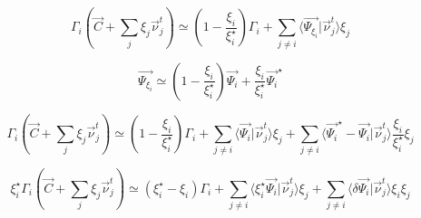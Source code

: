 \documentclass[aps,12pt]{revtex4}
\begin{document}
\begin{equation}
	\Gamma_i\left(\vec{C}+\sum_j \xi_j \vec{\nu}_j^t\right) \simeq \left(1-\dfrac{\xi_i}{\xi_i^\star}\right)\Gamma_i 
 + \sum_{j\not=i} \langle \vec{\Psi_{\xi_i}} \vert \vec{\nu}_j^t  \rangle \xi_j
\end{equation}

\begin{equation}
	\vec{\Psi_{\xi_i}} \simeq \left(1-\dfrac{\xi_i}{\xi_i^\star}\right) \vec{\Psi_i} + \dfrac{\xi_i}{\xi_i^\star} 
	\vec{\Psi_i}^\star
\end{equation}

\begin{equation}
	\Gamma_i\left(\vec{C}+\sum_j \xi_j \vec{\nu}_j^t\right) \simeq
	\left(1-\dfrac{\xi_i}{\xi_i^\star}\right)\Gamma_i 
	+\sum_{j\not=i} \langle \vec{\Psi_i} \vert \vec{\nu}_j^t  \rangle \xi_j
	+\sum_{j\not=i} \langle \vec{\Psi_i}^\star - \vec{\Psi_i} \vert \vec{\nu}_j^t  \rangle \dfrac{\xi_i}{\xi_i^\star} \xi_j
\end{equation}

\begin{equation}
	\xi_i^\star\Gamma_i\left(\vec{C}+\sum_j \xi_j \vec{\nu}_j^t\right) \simeq
	\left(\xi_i^\star- \xi_i\right)\Gamma_i 
	+\sum_{j\not=i} \langle \xi_i^\star \vec{\Psi_i} \vert \vec{\nu}_j^t  \rangle \xi_j
	+\sum_{j\not=i} \langle \delta\vec{\Psi_i} \vert \vec{\nu}_j^t  \rangle \xi_i \xi_j
\end{equation}
\end{document}
